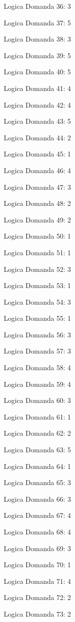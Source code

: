 \documentclass[20pt, a4paper]{article}
\begin{document}
\begin{itemize}[leftmargin=*]
\item [Logica] Domanda 36: 3
\item [Logica] Domanda 37: 5
\item [Logica] Domanda 38: 3
\item [Logica] Domanda 39: 5
\item [Logica] Domanda 40: 5
\item [Logica] Domanda 41: 4
\item [Logica] Domanda 42: 4
\item [Logica] Domanda 43: 5
\item [Logica] Domanda 44: 2
\item [Logica] Domanda 45: 1
\item [Logica] Domanda 46: 4
\item [Logica] Domanda 47: 3
\item [Logica] Domanda 48: 2
\item [Logica] Domanda 49: 2
\item [Logica] Domanda 50: 1
\item [Logica] Domanda 51: 1
\item [Logica] Domanda 52: 3
\item [Logica] Domanda 53: 1
\item [Logica] Domanda 54: 3
\item [Logica] Domanda 55: 1
\item [Logica] Domanda 56: 3
\item [Logica] Domanda 57: 3
\item [Logica] Domanda 58: 4
\item [Logica] Domanda 59: 4
\item [Logica] Domanda 60: 3
\item [Logica] Domanda 61: 1
\item [Logica] Domanda 62: 2
\item [Logica] Domanda 63: 5
\item [Logica] Domanda 64: 1
\item [Logica] Domanda 65: 3
\item [Logica] Domanda 66: 3
\item [Logica] Domanda 67: 4
\item [Logica] Domanda 68: 4
\item [Logica] Domanda 69: 3
\item [Logica] Domanda 70: 1
\item [Logica] Domanda 71: 4
\item [Logica] Domanda 72: 2
\item [Logica] Domanda 73: 2

\end{itemize}
\end{document}
